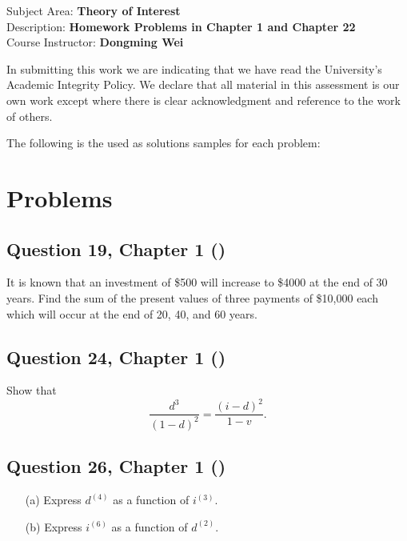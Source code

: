 \documentclass[12pt, a4paper]{article}
\begin{document}
\begin{titlepage}
  \begin{flushleft}
      Subject Area: \textbf{Theory of Interest} \\
      Description: \textbf{Homework Problems in Chapter 1 and Chapter 22} \\
      Course Instructor: \textbf{Dongming Wei} \\
    \end{flushleft}
    
    \vspace{0.5cm}
    
    {\footnotesize In submitting this work we are indicating
    that we have read the University's Academic Integrity Policy. We
    declare that all material in this assessment is our own work except
    where there is clear acknowledgment and reference to the work of
    others.\par}
\end{titlepage}
The following is the used as solutions samples for each problem:
\newpage
\section*{Problems}
\subsection*{Question 19, Chapter 1  (\cite{toi3rd})}
\noindent It is known that an investment of \$500 will increase to \$4000 at the end of 30 years. Find the sum of the present values of three payments of \$10,000 each which will occur at the end of 20, 40, and 60 years.

\subsection*{Question 24, Chapter 1  (\cite{toi3rd})}
\noindent Show that
\[
\frac{d^3}{(1 - d)^2} = \frac{(i - d)^2}{1 - v}.
\]

\subsection*{Question 26, Chapter 1  (\cite{toi3rd})}
\noindent
\begin{enumerate}
    \item[(a)] Express \( d^{(4)} \) as a function of \( i^{(3)} \).
    \item[(b)] Express \( i^{(6)} \) as a function of \( d^{(2)} \).
\end{enumerate}
\end{document}
